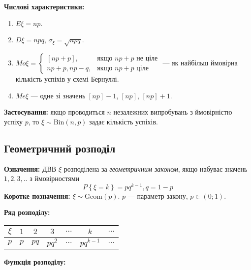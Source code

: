 \noindent\textbf{Числові характеристики:}
\begin{enumerate}
    \item $E\xi = np$.
    \item $D\xi = npq$, $\sigma_\xi = \sqrt{npq}$.
    \item ${Mo}\xi = \begin{cases}
        \left[np+p\right], & \text{якщо } np+p \text{ не ціле}\\
        np+p, np-q, & \text{якщо } np+p \text{ ціле}
    \end{cases}$ --- як найбільш ймовірна кількість успіхів у схемі Бернуллі.
    \item ${Me}\xi$ --- одне зі значень $\left[np\right] - 1$, $\left[np\right]$, $\left[np\right] + 1$.
\end{enumerate}

\noindent\textbf{Застосування:} якщо проводиться $n$ незалежних випробувань з ймовірністю успіху $p$, 
то $\xi \sim \mathrm{Bin}(n, p)$ задає кількість успіхів.

\subsection{Геометричний розподіл}
\noindent\textbf{Означення:}
    ДВВ $\xi$ розподілена за \emph{геометричним законом}, 
    якщо набуває значень $1,2,3,..$ з ймовірностями \begin{equation}
        P\left\{\xi = k\right\} = pq^{k-1}, q = 1 - p
    \end{equation}
    \textbf{Коротке позначення:} $\xi \sim \mathrm{Geom}(p)$.
    $p$ --- параметр закону, $p\in (0;1)$.

\noindent\textbf{Ряд розподілу:}

\begin{tabular}{|c|c|c|c|c|c|c|}
    \hline
    $\xi$ & $1$ & $2$ & $3$ & $...$ & $k$ & $...$ \\
    \hline
    $p$ & $p$ & $pq$ & $pq^2$ & $...$ & $pq^{k-1}$ & $...$ \\
    \hline
\end{tabular}

\noindent\textbf{Функція розподілу:}

